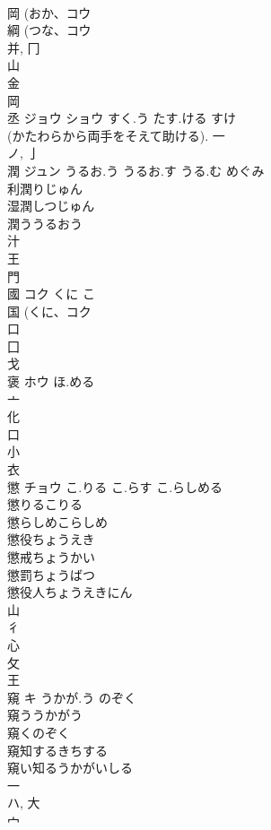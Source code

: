 \documentclass[8pt]{extreport}
\begin{document}
\begin{CJK}{UTF8}{min}
\\	岡 (おか、コウ 
\\	綱 (つな、コウ 
\\	并, 冂 
\\	山 
\\	金 
\\	岡 
\\	丞	ジョウ ショウ	すく.う たす.ける すけ	
\\	(かたわらから両手をそえて助ける).			一 
\\	ノ, 亅 
\\	潤	ジュン	うるお.う うるお.す うる.む めぐみ	
\\	利潤りじゅん
\\	湿潤しつじゅん
\\	潤ううるおう
\\	汁 
\\	王 
\\	門 
\\	國	コク	くに こ	
\\	国 (くに、コク 
\\	口 
\\	囗 
\\	戈 
\\	褒	ホウ	ほ.める	
\\	亠 
\\	化 
\\	口 
\\	小 
\\	衣 
\\	懲	チョウ	こ.りる こ.らす こ.らしめる	
\\	懲りるこりる
\\	懲らしめこらしめ
\\	懲役ちょうえき
\\	懲戒ちょうかい
\\	懲罰ちょうばつ
\\	懲役人ちょうえきにん
\\	山 
\\	彳 
\\	心 
\\	攵 
\\	王 
\\	窺	キ	うかが.う のぞく	
\\	窺ううかがう
\\	窺くのぞく
\\	窺知するきちする
\\	窺い知るうかがいしる
\\	一 
\\	ハ, 大 
\\	宀 

\end{CJK}
\end{document}
